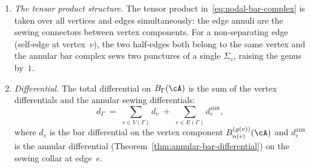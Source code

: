 \begin{construction}
\begin{enumerate}[label=\textup{(\roman*)}]
 The sewing map at edge~$e$ is
 \begin{equation}\label{eq:sewing-map}
 \sigma_e \colon
 B^{(g(v_+))}_{n(v_+)}(\cA)
 \otimes
 B^{\mathrm{ann}}_e(\cA)
 \otimes
 B^{(g(v_-))}_{n(v_-)}(\cA)
 \longrightarrow
 B_\Gamma(\cA),
 \end{equation}
 given by identifying the output boundary circle of the
 annulus with a puncture of $\Sigma_{v_+}$ and the input
 boundary circle with a puncture of~$\Sigma_{v_-}$.

\item \emph{The tensor product structure.}
 The tensor product in~\eqref{eq:nodal-bar-complex} is taken
 over all vertices and edges simultaneously: the edge annuli
 are the sewing connectors between vertex components. For a
 non-separating edge (self-edge at vertex~$v$), the two
 half-edges both belong to the same vertex and the annular bar
 complex sews two punctures of a single $\Sigma_v$, raising
 the genus by~$1$.

\item \emph{Differential.}
 The total differential on $B_\Gamma(\cA)$ is the sum of the
 vertex differentials and the annular sewing differentials:
 \begin{equation}\label{eq:nodal-bar-differential}
 d_\Gamma \;=\;
 \sum_{v\in V(\Gamma)} d_v
 \;+\;
 \sum_{e\in E(\Gamma)} d^{\mathrm{ann}}_e,
 \end{equation}
 where $d_v$ is the bar differential on the vertex component
 $B^{(g(v))}_{n(v)}(\cA)$ and $d^{\mathrm{ann}}_e$ is the
 annular differential
 (Theorem~\ref{thm:annular-bar-differential})
 on the sewing collar at edge~$e$.
\end{enumerate}
\end{construction}


